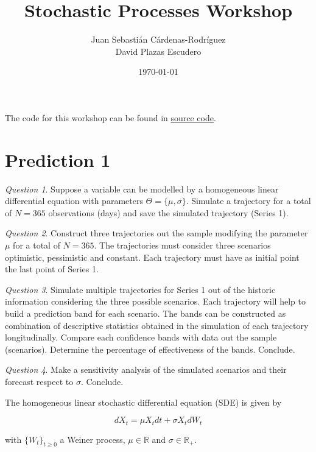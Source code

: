 \documentclass[11pt]{article}
\title{Stochastic Processes Workshop}
\author{Juan Sebasti\'an C\'ardenas-Rodríguez \\
       David Plazas Escudero \\
       \scalebox{0.7}{Mathematical Engineering, Universidad EAFIT}}
\date{\today}
\theoremstyle{definition}
\theoremstyle{remark}
\theoremstyle{remark}
\newtheorem{question}{Question}
\newcommand{\R}{{\mathbb{R}}}
\begin{document}
\maketitle

The code for this workshop can be found in
\href{https://bit.ly/3ciL6Px}{source code}.

\section*{Prediction 1}
\begin{question}
  Suppose a variable can be modelled by a homogeneous linear
  differential equation with parameters $\Theta = \{\mu,
  \sigma\}$. Simulate a trajectory for a total of $N = 365$
  observations (days) and save the simulated trajectory (Series 1).
\end{question}

\begin{question}
  Construct three trajectories out the sample modifying the parameter
  $\mu$ for a total of $N = 365$. The trajectories must consider three
  scenarios optimistic, pessimistic and constant. Each trajectory must
  have as initial point the last point of Series 1.
\end{question}

\begin{question}
  Simulate multiple trajectories for Series 1 out of the historic
  information considering the three possible scenarios. Each
  trajectory will help to build a prediction band for each
  scenario. The bands can be constructed as combination of descriptive
  statistics obtained in the simulation of each trajectory
  longitudinally. Compare each confidence bands with data out the
  sample (scenarios). Determine the percentage of effectiveness of the
  bands. Conclude.
\end{question}

\begin{question}
  Make a sensitivity analysis of the simulated scenarios and their
  forecast respect to $\sigma$. Conclude.
\end{question}

The homogeneous linear stochastic differential equation (SDE) is given by

\begin{equation*}
  dX_t = \mu X_t dt + \sigma X_t dW_t
\end{equation*}

with $\{W_t\}_{t \ge 0}$ a Weiner process, $\mu \in \R$ and
$\sigma \in \R_+$.
\end{document}
